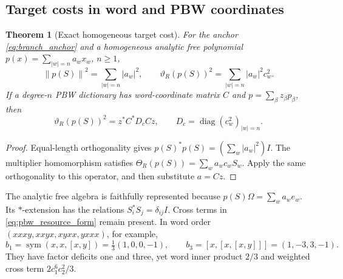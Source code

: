 \documentclass[11pt,a4paper]{amsart}
\numberwithin{equation}{section}
\newtheorem{theorem}{Theorem}[section]
\theoremstyle{definition}
\theoremstyle{remark}
\DeclareMathOperator{\diag}{diag}
\DeclareMathOperator{\sym}{sym}
\newcommand{\norm}[1]{\left\lVert#1\right\rVert}
\begin{document}
\subsection{Target costs in word and PBW coordinates}
\begin{theorem}[Exact homogeneous target cost]\label{thm:fock_target_cost}
For the anchor \eqref{eq:branch_anchor} and a homogeneous analytic free polynomial
$p(x)=\sum_{|w|=n}a_wx_w$, $n\ge1$,
\begin{equation}\label{eq:fock_target_cost}
 \norm{p(S)}^2=\sum_{|w|=n}|a_w|^2,\qquad
 \vartheta_R(p(S))^2=\sum_{|w|=n}|a_w|^2c_w^2.
\end{equation}
If a degree-$n$ PBW dictionary has word-coordinate matrix $C$ and $p=\sum_\beta z_\beta p_\beta$, then
\begin{equation}\label{eq:pbw_resource_form}
 \vartheta_R(p(S))^2=z^*C^*D_cCz,\qquad
 D_c=\diag(c_w^2)_{|w|=n}.
\end{equation}
\end{theorem}
\begin{proof}
Equal-length orthogonality gives
$p(S)^*p(S)=(\sum_w|a_w|^2)I$.
The multiplier homomorphism satisfies
$\Theta_R(p(S))=\sum_wa_wc_wS_w$.
Apply the same orthogonality to this operator, and then substitute $a=Cz$.
\end{proof}

The analytic free algebra is faithfully represented because $p(S)\Omega=\sum_wa_we_w$. Its $*$-extension has the relations $S_i^*S_j=\delta_{ij}I$. Cross terms in \eqref{eq:pbw_resource_form} remain present. In word order $(xxxy,xxyx,xyxx,yxxx)$, for example,
\[
 b_1=\sym(x,x,[x,y])=\tfrac13(1,0,0,-1),\qquad
 b_3=[x,[x,[x,y]]]=(1,-3,3,-1).
\]
They have factor deficits one and three, yet word inner product $2/3$ and weighted cross term $2c_1^6c_2^2/3$.
\end{document}
